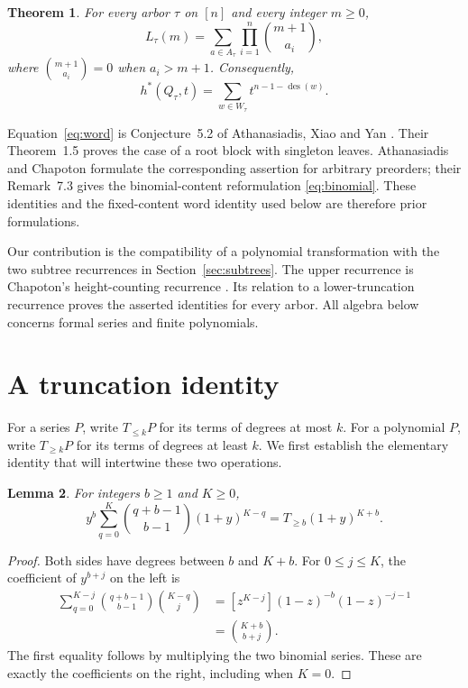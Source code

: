\documentclass[11pt]{article}
\newtheorem{theorem}{Theorem}
\newtheorem{lemma}[theorem]{Lemma}
\newcommand{\des}{\operatorname{des}}
\begin{document}
\begin{theorem}\label{thm:main}
For every arbor $\tau$ on $[n]$ and every integer $m\geq0$,
\begin{equation}\label{eq:binomial}
 L_\tau(m)=\sum_{a\in A_\tau}\prod_{i=1}^n\binom{m+1}{a_i},
\end{equation}
where $\binom{m+1}{a_i}=0$ when $a_i>m+1$. Consequently,
\begin{equation}\label{eq:word}
 h^*(Q_\tau,t)=\sum_{w\in W_\tau}t^{n-1-\des(w)}.
\end{equation}
\end{theorem}

Equation~\eqref{eq:word} is Conjecture~5.2 of Athanasiadis, Xiao and
Yan \cite{AXY}. Their Theorem~1.5 proves the case of a root block with
singleton leaves. Athanasiadis and Chapoton \cite[Conjecture~4.4]{AC}
formulate the corresponding assertion for arbitrary preorders; their
Remark~7.3 gives the binomial-content reformulation
\eqref{eq:binomial}. These identities and the fixed-content word identity
used below are therefore prior formulations.

Our contribution is the compatibility of a polynomial transformation with
the two subtree recurrences in Section~\ref{sec:subtrees}. The upper
recurrence is Chapoton's height-counting recurrence
\cite[Proposition~2.1]{Chapoton}. Its relation to a lower-truncation
recurrence proves the asserted identities for every arbor. All algebra
below concerns formal series and finite polynomials.

\section{A truncation identity}

For a series $P$, write $T_{\leq k}P$ for its terms of degrees at most
$k$. For a polynomial $P$, write $T_{\geq k}P$ for its terms of degrees
at least $k$. We first establish the elementary identity that will
intertwine these two operations.

\begin{lemma}\label{lem:local}
For integers $b\geq1$ and $K\geq0$,
\begin{equation}\label{eq:local}
 y^b\sum_{q=0}^{K}\binom{q+b-1}{b-1}(1+y)^{K-q}
       =T_{\geq b}(1+y)^{K+b}.
\end{equation}
\end{lemma}

\begin{proof}
Both sides have degrees between $b$ and $K+b$. For $0\leq j\leq K$,
the coefficient of $y^{b+j}$ on the left is
\begin{align*}
 \sum_{q=0}^{K-j}\binom{q+b-1}{b-1}\binom{K-q}{j}
   &=[z^{K-j}](1-z)^{-b}(1-z)^{-j-1}\\
   &=\binom{K+b}{b+j}.
\end{align*}
The first equality follows by multiplying the two binomial series.
These are exactly the coefficients on the right, including when $K=0$.
\end{proof}
\end{document}
